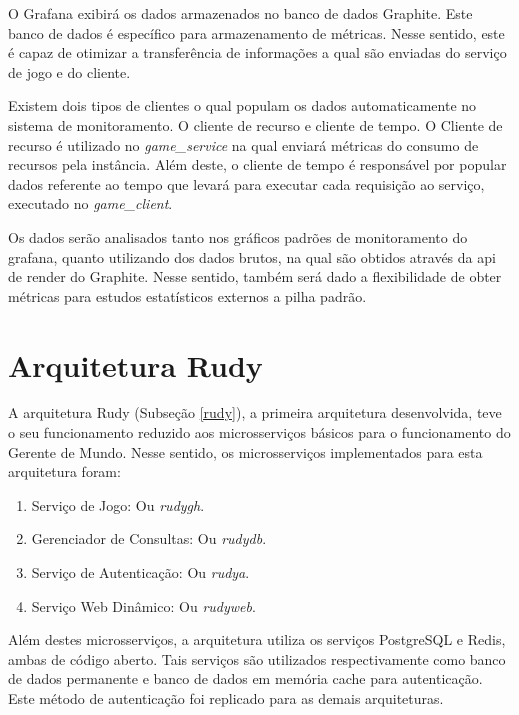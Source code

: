 O Grafana exibirá os dados armazenados no banco de dados Graphite.
%
Este banco de dados é específico para armazenamento de métricas.
%
Nesse sentido, este é capaz de otimizar a transferência de informações a qual são enviadas do serviço de jogo e do cliente.

Existem dois tipos de clientes o qual populam os dados automaticamente no sistema de monitoramento.
%
O cliente de recurso e cliente de tempo. 
%
O Cliente de recurso é utilizado no \textit{game\_service} na qual enviará métricas do consumo de recursos pela instância. %
%
Além deste, o cliente de tempo é responsável por popular dados referente ao tempo que levará para executar cada requisição ao serviço, executado no \textit{game\_client}. %

Os dados serão analisados tanto nos gráficos padrões de monitoramento do grafana, quanto utilizando dos dados brutos, na qual são obtidos através da \ac{api} de render do Graphite. %
%
Nesse sentido, também será dado a flexibilidade de obter métricas para estudos estatísticos externos a pilha padrão. %

\section{Arquitetura Rudy}
\label{sec:arc_rudy}

A arquitetura Rudy (Subseção \ref{rudy}), a primeira arquitetura desenvolvida, teve o seu funcionamento reduzido aos microsserviços básicos para o funcionamento do Gerente de Mundo.
%
Nesse sentido, os microsserviços implementados para esta arquitetura foram:

\begin{enumerate}
    \item Serviço de Jogo: Ou \textit{rudygh}.
    \item Gerenciador de Consultas: Ou \textit{rudydb}.
    \item Serviço de Autenticação: Ou \textit{rudya}.
    \item Serviço Web Dinâmico: Ou \textit{rudyweb}.
\end{enumerate}



Além destes microsserviços, a arquitetura utiliza os serviços PostgreSQL e Redis, ambas de código aberto.
%
Tais serviços são utilizados respectivamente como banco de dados permanente e banco de dados em memória cache para autenticação.
%
Este método de autenticação foi replicado para as demais arquiteturas.



